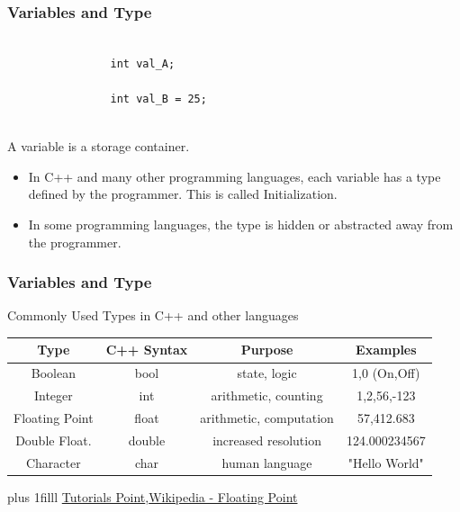 \documentclass[fleqn]{beamer} %
\newcommand{\sectiontitleII}{Variables and Type}
\newcommand{\btVFill}{\vskip0pt plus 1filll}
\begin{document}
	\begin{frame}[label=sectionII,containsverbatim] \small
		\frametitle{\sectiontitleII}
	
	
			\begin{lstlisting}
			
				int val_A; 
				
				int val_B = 25;
			
			\end{lstlisting}
	
			A variable is a storage container.
			\begin{itemize}
				\item In C++ and many other programming languages, each variable has a type defined by the programmer. This is called {\BL Initialization}.
				\item In some programming languages, the type is hidden or abstracted away from the programmer. 
			\end{itemize}
	
		\end{frame}

	\begin{frame} \small
		\frametitle{\sectiontitleII}
			
		Commonly Used Types in C++ and other languages \vspace{5mm}\\
		\renewcommand*{\arraystretch}{1.5}
		\begin{tabular}{|c|c|c|c|}\hline			
			Type & C++ Syntax & Purpose & Examples  \\ \hline
			Boolean & bool & state, logic & 1,0 (On,Off) \\ \hline 	
			Integer & int & arithmetic, counting & 1,2,56,-123 \\ \hline
			Floating Point & float & arithmetic, computation & 57,412.683 \\ \hline
			Double Float. & double & increased resolution & 124.000234567\\ \hline
			Character & char & human language & "Hello World"\\ \hline	 			
	
		\end{tabular}
	
	\btVFill
	{\tiny \href{https://www.tutorialspoint.com/cplusplus/cpp_data_types.htm}{Tutorials Point},\href{https://en.wikipedia.org/wiki/Single-precision_floating-point_format}{Wikipedia - Floating Point}}
	\end{frame}	
\end{document}
